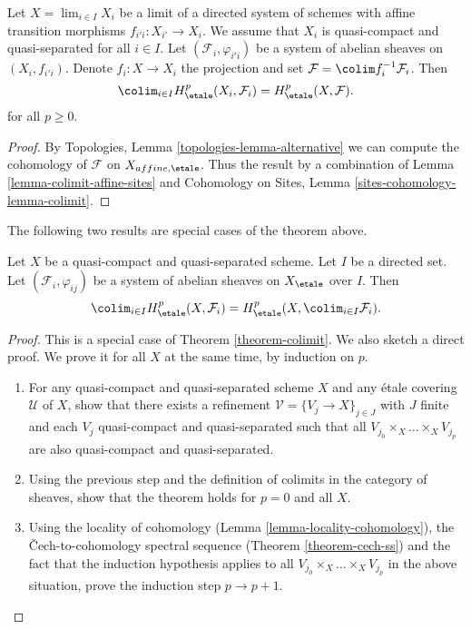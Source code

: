 \begin{theorem}
\label{theorem-colimit}
Let $X = \lim_{i \in I} X_i$ be a limit of a directed system of schemes
with affine transition morphisms $f_{i'i} : X_{i'} \to X_i$. We assume
that $X_i$ is quasi-compact and quasi-separated for all $i \in I$.
Let $(\mathcal{F}_i, \varphi_{i'i})$ be a system of abelian sheaves
on $(X_i, f_{i'i})$. Denote $f_i : X \to X_i$ the projection and set
$\mathcal{F} = \colim f_i^{-1}\mathcal{F}_i$. Then
$$
\colim_{i\in I} H_\etale^p(X_i, \mathcal{F}_i) = H_\etale^p(X, \mathcal{F}).
$$
for all $p \geq 0$.
\end{theorem}

\begin{proof}
By Topologies, Lemma \ref{topologies-lemma-alternative}
we can compute the cohomology
of $\mathcal{F}$ on $X_{affine, \etale}$.
Thus the result by a combination of
Lemma \ref{lemma-colimit-affine-sites}
and
Cohomology on Sites, Lemma \ref{sites-cohomology-lemma-colimit}.
\end{proof}

\noindent
The following two results are special cases of the theorem above.

\begin{lemma}
\label{lemma-colimit}
Let $X$ be a quasi-compact and quasi-separated scheme. Let $I$
be a directed set. Let $(\mathcal{F}_i, \varphi_{ij})$ be a system
of abelian sheaves on $X_\etale$ over $I$. Then
$$
\colim_{i\in I} H_\etale^p(X, \mathcal{F}_i) = H_\etale^p(X,
\colim_{i\in I} \mathcal{F}_i).
$$
\end{lemma}

\begin{proof}
This is a special case of Theorem \ref{theorem-colimit}.
We also sketch a direct proof.
We prove it for all $X$ at the same time, by induction on $p$.
\begin{enumerate}
\item
For any quasi-compact and quasi-separated scheme $X$ and any \'etale covering
$\mathcal{U}$ of $X$, show that there exists a refinement
$\mathcal{V} = \{V_j \to X\}_{j\in J}$ with $J$ finite and each $V_j$
quasi-compact and quasi-separated such that all
$V_{j_0} \times_X \ldots \times_X V_{j_p}$ are also
quasi-compact and quasi-separated.
\item
Using the previous step and the definition of colimits in the category of
sheaves, show that the theorem holds for $p = 0$ and all $X$.
\item
Using the locality of cohomology
(Lemma \ref{lemma-locality-cohomology}),
the {\v C}ech-to-cohomology spectral sequence
(Theorem \ref{theorem-cech-ss}) and the fact that the induction
hypothesis applies to all
$V_{j_0} \times_X \ldots \times_X V_{j_p}$
in the above situation, prove the induction step $p \to p + 1$.
\end{enumerate}
\end{proof}


